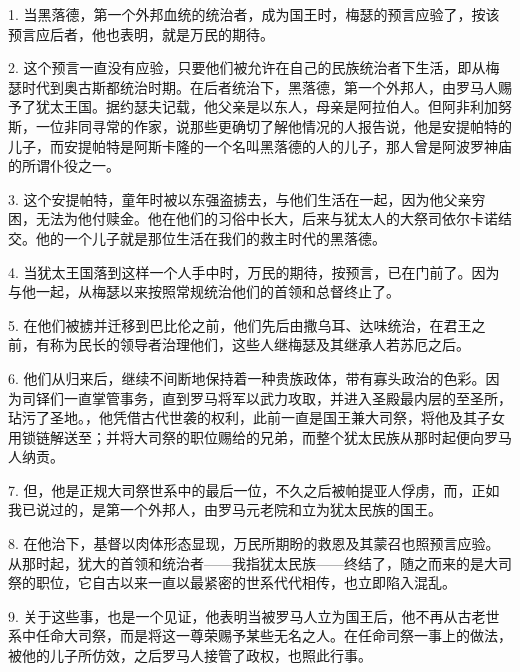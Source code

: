 1. 当黑落德，第一个外邦血统的统治者，成为国王时，梅瑟的预言应验了，按该预言应后者，他也表明，就是万民的期待。\par

2. 这个预言一直没有应验，只要他们被允许在自己的民族统治者下生活，即从梅瑟时代到奥古斯都统治时期。在后者统治下，黑落德，第一个外邦人，由罗马人赐予了犹太王国。据约瑟夫记载，他父亲是以东人，母亲是阿拉伯人。但阿非利加努斯，一位非同寻常的作家，说那些更确切了解他情况的人报告说，他是安提帕特的儿子，而安提帕特是阿斯卡隆的一个名叫黑落德的人的儿子，那人曾是阿波罗神庙的所谓仆役之一。\par

3. 这个安提帕特，童年时被以东强盗掳去，与他们生活在一起，因为他父亲穷困，无法为他付赎金。他在他们的习俗中长大，后来与犹太人的大祭司依尔卡诺结交。他的一个儿子就是那位生活在我们的救主时代的黑落德。\par

4. 当犹太王国落到这样一个人手中时，万民的期待，按预言，已在门前了。因为与他一起，从梅瑟以来按照常规统治他们的首领和总督终止了。\par

5. 在他们被掳并迁移到巴比伦之前，他们先后由撒乌耳、达味统治，在君王之前，有称为民长的领导者治理他们，这些人继梅瑟及其继承人若苏厄之后。\par

6. 他们从归来后，继续不间断地保持着一种贵族政体，带有寡头政治的色彩。因为司铎们一直掌管事务，直到罗马将军以武力攻取，并进入圣殿最内层的至圣所，玷污了圣地。，他凭借古代世袭的权利，此前一直是国王兼大司祭，将他及其子女用锁链解送至；并将大司祭的职位赐给的兄弟，而整个犹太民族从那时起便向罗马人纳贡。\par

7. 但，他是正规大司祭世系中的最后一位，不久之后被帕提亚人俘虏，而，正如我已说过的，是第一个外邦人，由罗马元老院和立为犹太民族的国王。\par

8. 在他治下，基督以肉体形态显现，万民所期盼的救恩及其蒙召也照预言应验。从那时起，犹大的首领和统治者——我指犹太民族——终结了，随之而来的是大司祭的职位，它自古以来一直以最紧密的世系代代相传，也立即陷入混乱。\par

9. 关于这些事，也是一个见证，他表明当被罗马人立为国王后，他不再从古老世系中任命大司祭，而是将这一尊荣赐予某些无名之人。在任命司祭一事上的做法，被他的儿子所仿效，之后罗马人接管了政权，也照此行事。\par

